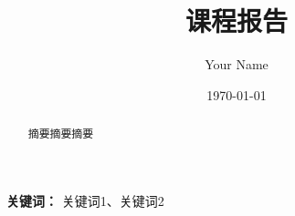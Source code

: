 \documentclass[UTF8,a4paper,12pt,fontset=fandol]{ctexart}
\title{课程报告}
\author{Your Name}
\date{\today}
\begin{document}
\maketitle
\begin{abstract}
    摘要摘要摘要
\end{abstract}
\noindent\textbf{关键词：} 关键词1、关键词2
\tableofcontents
\clearpage







\printbibliography
\appendix
{} 
\renewcommand{\thefigure}{\thesection.\arabic{figure}} 
\setcounter{figure}{0}   

\end{document}
